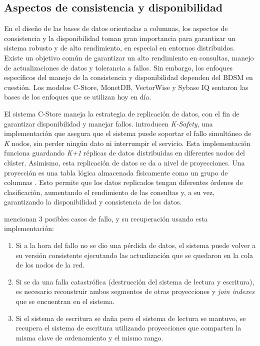 \subsection{Aspectos de consistencia y disponibilidad}
En el diseño de las bases de datos orientadas a columnas, los aspectos de consistencia y la disponibilidad toman gran importancia para garantizar un sistema robusto y de alto rendimiento, en especial en entornos distribuidos. Existe un objetivo común de garantizar un alto rendimiento en consultas, manejo de actualizaciones de datos y tolerancia a fallos. Sin embargo, los enfoques específicos del manejo de la consistencia y disponibilidad dependen del BDSM en  cuestión. Los modelos C-Store, MonetDB, VectorWise y Sybase IQ sentaron las bases de los enfoques que se utilizan hoy en día.

El sistema C-Store maneja la estrategia de replicación de datos, con el fin de garantizar disponibilidad y manejar fallos. \textcite{stonebraker2005cstore} introducen \textit{K-Safety}, una implementación que asegura que el sistema puede soportar el fallo simultáneo de \textit{K} nodos, sin perder ningún dato ni interrumpir el servicio. Esta implementación funciona guardando \textit{K+1} réplicas de datos distribuidas en diferentes nodos del clúster. Asimismo, esta replicación de datos se da a nivel de proyecciones. Una proyección es una tabla lógica almacenada físicamente como un grupo de columnas \parencite{matei2010}. Esto permite que los datos replicados tengan diferentes órdenes de clasificación, aumentando el rendimiento de las consultas y, a su vez, garantizando la disponibilidad y consistencia de los datos.

\textcite{stonebraker2005cstore} mencionan 3 posibles casos de fallo, y su recuperación usando esta implementación:
    \begin{enumerate}[1.]
        \item Si a la hora del fallo no se dio una pérdida de datos, el sistema puede volver a su versión consistente ejecutando las actualización que se quedaron en la cola de los nodos de la red.
        \item Si se da una falla catastrófica (destrucción del sistema de lectura y escritura), es necesario reconstruir ambos segmentos de otras proyecciones y \textit{join indexes} que se encuentran en el sistema.
        \item Si el sistema de escritura se daña pero el sistema de lectura se mantuvo, se recupera el sistema de escritura utilizando proyecciones que comparten la misma clave de ordenamiento y el mismo rango.
    \end{enumerate}

